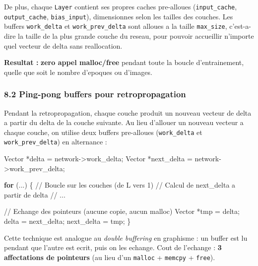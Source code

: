 \documentclass[
  letterpaper,
  DIV=11,
  numbers=noendperiod]{scrartcl}
\newenvironment{Shaded}{\begin{snugshade}}{\end{snugshade}}
\newcommand{\CommentTok}[1]{\textcolor[rgb]{0.37,0.37,0.37}{#1}}
\newcommand{\ControlFlowTok}[1]{\textcolor[rgb]{0.00,0.23,0.31}{\textbf{#1}}}
\newcommand{\NormalTok}[1]{\textcolor[rgb]{0.00,0.23,0.31}{#1}}
\newcommand{\OperatorTok}[1]{\textcolor[rgb]{0.37,0.37,0.37}{#1}}
\begin{document}
De plus, chaque \texttt{Layer} contient ses propres caches pre-alloues (\texttt{input\_cache}, \texttt{output\_cache}, \texttt{bias\_input}), dimensionnes selon les tailles des couches. Les buffers \texttt{work\_delta} et \texttt{work\_prev\_delta} sont alloues a la taille \texttt{max\_size}, c'est-a-dire la taille de la plus grande couche du reseau, pour pouvoir accueillir n'importe quel vecteur de delta sans reallocation.

\textbf{Resultat :} \textbf{zero appel malloc/free} pendant toute la boucle d'entrainement, quelle que soit le nombre d'epoques ou d'images.

\subsubsection{8.2 Ping-pong buffers pour retropropagation}\label{ping-pong}

Pendant la retropropagation, chaque couche produit un nouveau vecteur de delta a partir du delta de la couche suivante. Au lieu d'allouer un nouveau vecteur a chaque couche, on utilise deux buffers pre-alloues (\texttt{work\_delta} et \texttt{work\_prev\_delta}) en alternance :

\begin{Shaded}
\begin{Highlighting}[]
\NormalTok{Vector }\OperatorTok{*}\NormalTok{delta      }\OperatorTok{=}\NormalTok{ network}\OperatorTok{{-}\textgreater{}}\NormalTok{work\_delta}\OperatorTok{;}
\NormalTok{Vector }\OperatorTok{*}\NormalTok{next\_delta }\OperatorTok{=}\NormalTok{ network}\OperatorTok{{-}\textgreater{}}\NormalTok{work\_prev\_delta}\OperatorTok{;}

\ControlFlowTok{for} \OperatorTok{(}\NormalTok{...}\OperatorTok{)} \OperatorTok{\{}  \CommentTok{// Boucle sur les couches (de L vers 1)}
    \CommentTok{// Calcul de next\_delta a partir de delta}
    \CommentTok{// ...}

    \CommentTok{// Echange des pointeurs (aucune copie, aucun malloc)}
\NormalTok{    Vector }\OperatorTok{*}\NormalTok{tmp }\OperatorTok{=}\NormalTok{ delta}\OperatorTok{;}
\NormalTok{    delta       }\OperatorTok{=}\NormalTok{ next\_delta}\OperatorTok{;}
\NormalTok{    next\_delta  }\OperatorTok{=}\NormalTok{ tmp}\OperatorTok{;}
\OperatorTok{\}}
\end{Highlighting}
\end{Shaded}

Cette technique est analogue au \emph{double buffering} en graphisme : un buffer est lu pendant que l'autre est ecrit, puis on les echange. Cout de l'echange : \textbf{3 affectations de pointeurs} (au lieu d'un \texttt{malloc} + \texttt{memcpy} + \texttt{free}).
\end{document}
